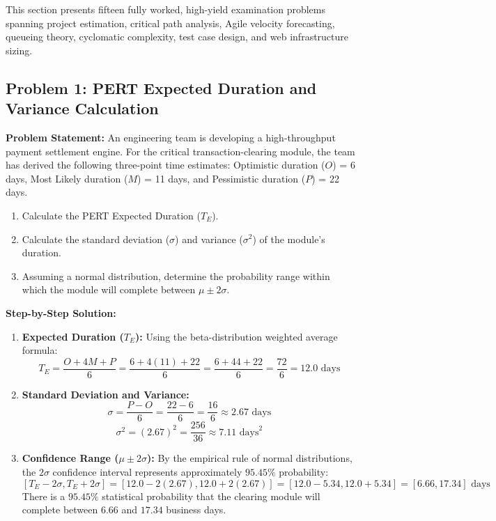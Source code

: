 This section presents fifteen fully worked, high-yield examination problems spanning project estimation, critical path analysis, Agile velocity forecasting, queueing theory, cyclomatic complexity, test case design, and web infrastructure sizing.

\subsection*{Problem 1: PERT Expected Duration and Variance Calculation}
\textbf{Problem Statement:} An engineering team is developing a high-throughput payment settlement engine. For the critical transaction-clearing module, the team has derived the following three-point time estimates: Optimistic duration ($O$) = 6 days, Most Likely duration ($M$) = 11 days, and Pessimistic duration ($P$) = 22 days.
\begin{enumerate}[label=(\alph*)]
    \item Calculate the PERT Expected Duration ($T_E$).
    \item Calculate the standard deviation ($\sigma$) and variance ($\sigma^2$) of the module's duration.
    \item Assuming a normal distribution, determine the probability range within which the module will complete between $\mu \pm 2\sigma$.
\end{enumerate}

\textbf{Step-by-Step Solution:}
\begin{enumerate}[label=(\alph*)]
    \item \textbf{Expected Duration ($T_E$):}
    Using the beta-distribution weighted average formula:
    \[
    T_E = \frac{O + 4M + P}{6} = \frac{6 + 4(11) + 22}{6} = \frac{6 + 44 + 22}{6} = \frac{72}{6} = 12.0 \text{ days}
    \]
    \item \textbf{Standard Deviation and Variance:}
    \[
    \sigma = \frac{P - O}{6} = \frac{22 - 6}{6} = \frac{16}{6} \approx 2.67 \text{ days}
    \]
    \[
    \sigma^2 = (2.67)^2 = \frac{256}{36} \approx 7.11 \text{ days}^2
    \]
    \item \textbf{Confidence Range ($\mu \pm 2\sigma$):}
    By the empirical rule of normal distributions, the $2\sigma$ confidence interval represents approximately $95.45\%$ probability:
    \[
    [T_E - 2\sigma, T_E + 2\sigma] = [12.0 - 2(2.67), 12.0 + 2(2.67)] = [12.0 - 5.34, 12.0 + 5.34] = [6.66, 17.34] \text{ days}
    \]
    There is a $95.45\%$ statistical probability that the clearing module will complete between $6.66$ and $17.34$ business days.
\end{enumerate}

